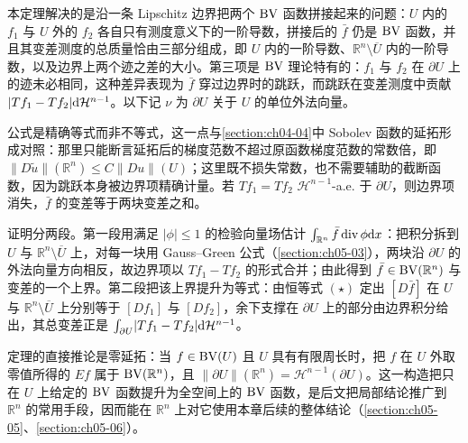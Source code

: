 \documentclass[../../main.tex]{subfiles}%
\begin{document}
\begin{remark}\label{remark:ch05-thm-5-8-动机}
本定理解决的是沿一条 Lipschitz 边界把两个 $\mathrm{BV}$ 函数拼接起来的问题：$U$ 内的 $f_1$ 与 $U$ 外的 $f_2$ 各自只有测度意义下的一阶导数，拼接后的 $\bar f$ 仍是 $\mathrm{BV}$ 函数，并且其变差测度的总质量恰由三部分组成，即 $U$ 内的一阶导数、$\mathbb{R}^n\setminus\overline{U}$ 内的一阶导数，以及边界上两个迹之差的大小。第三项是 $\mathrm{BV}$ 理论特有的：$f_1$ 与 $f_2$ 在 $\partial U$ 上的迹未必相同，这种差异表现为 $\bar f$ 穿过边界时的跳跃，而跳跃在变差测度中贡献 $\lvert Tf_1-Tf_2\rvert\mathrm{d}\mathcal{H}^{n-1}$。以下记 $\nu$ 为 $\partial U$ 关于 $U$ 的单位外法向量。

公式是精确等式而非不等式，这一点与\cref{section:ch04-04}中 Sobolev 函数的延拓形成对照：那里只能断言延拓后的梯度范数不超过原函数梯度范数的常数倍，即 $\lVert D\tilde u\rVert(\mathbb{R}^n)\leqslant C\lVert Du\rVert(U)$；这里既不损失常数，也不需要辅助的截断函数，因为跳跃本身被边界项精确计量。若 $Tf_1=Tf_2$ $\mathcal{H}^{n-1}$-a.e. 于 $\partial U$，则边界项消失，$\bar f$ 的变差等于两块变差之和。%

证明分两段。第一段用满足 $\lvert\phi\rvert\leqslant1$ 的检验向量场估计 $\int_{\mathbb{R}^n}\bar f\operatorname{div}\phi\mathrm{d} x$：把积分拆到 $U$ 与 $\mathbb{R}^n\setminus\overline{U}$ 上，对每一块用 Gauss--Green 公式（\cref{section:ch05-03}），两块沿 $\partial U$ 的外法向量方向相反，故边界项以 $Tf_1-Tf_2$ 的形式合并；由此得到 $\bar f\in\mathrm{BV}(\mathbb{R}^n)$ 与变差的一个上界。第二段把该上界提升为等式：由恒等式 $(\star)$ 定出 $[D\bar f]$ 在 $U$ 与 $\mathbb{R}^n\setminus\overline{U}$ 上分别等于 $[Df_1]$ 与 $[Df_2]$，余下支撑在 $\partial U$ 上的部分由边界积分给出，其总变差正是 $\int_{\partial U}\lvert Tf_1-Tf_2\rvert\mathrm{d}\mathcal{H}^{n-1}$。%

定理的直接推论是零延拓：当 $f\in\mathrm{BV}(U)$ 且 $U$ 具有有限周长时，把 $f$ 在 $U$ 外取零值所得的 $Ef$ 属于 $\mathrm{BV}(\mathbb{R}^n)$，且 $\lVert\partial U\rVert(\mathbb{R}^n)=\mathcal{H}^{n-1}(\partial U)$。这一构造把只在 $U$ 上给定的 $\mathrm{BV}$ 函数提升为全空间上的 $\mathrm{BV}$ 函数，是后文把局部结论推广到 $\mathbb{R}^n$ 的常用手段，因而能在 $\mathbb{R}^n$ 上对它使用本章后续的整体结论（\cref{section:ch05-05}、\cref{section:ch05-06}）。%
\end{remark}
\end{document}
